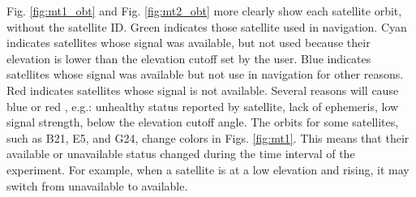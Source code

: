 \documentclass[letterpaper, 10 pt,onecolumn]{article}
\begin{document}
	Fig. \ref{fig:mt1_obt} and Fig. \ref{fig:mt2_obt} more clearly show each satellite orbit, without the satellite ID. 
	Green indicates those satellite  used in navigation. 
	Cyan indicates satellites whose signal was available, but not used because their elevation is  lower than the elevation cutoff set by the user. 
	Blue indicates satellites whose signal was available but not use in navigation for other reasons. 
	Red  indicates satellites whose signal is not available. 
	Several reasons will cause blue or red \cite{ucenter}, e.g.: unhealthy status reported by satellite, lack of ephemeris, low signal strength, below the elevation cutoff angle. 
	The orbits for some satellites, such as B21, E5, and G24, change colors in Figs. \ref{fig:mt1}.
	This means that their available or unavailable status changed during the time interval of the experiment.
	For example, when a satellite is at a low elevation and rising, it may switch from unavailable to available. 
\end{document}
